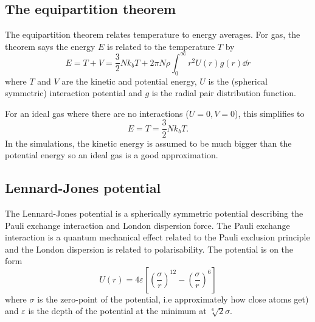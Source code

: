 \documentclass[fleqn]{scrartcl}
\renewcommand{\epsilon}{\varepsilon}
\begin{document}
	
	\subsection{The equipartition theorem}
	The equipartition theorem relates temperature to energy averages. For gas, the theorem says the energy $E$ is related to the temperature $T$ by
	\begin{equation}
		E = T + V = \frac32 Nk_bT+2\pi N\rho\int_0^\infty r^2U(r)g(r)\dd{r}
	\end{equation}
	where $T$ and $V$ are the kinetic and potential energy, $U$ is the (spherical symmetric) interaction potential and $g$ is the radial pair distribution function. 
	
	For an ideal gas where there are no interactions ($U=0,V=0$), this simplifies to	
	\begin{equation}
		E = T = \frac32Nk_b T.
	\end{equation}
	In the simulations, the kinetic energy is assumed to be much bigger than the potential energy so an ideal gas is a good approximation.
	
	
	\subsection{Lennard-Jones potential}
	The Lennard-Jones potential is a spherically symmetric potential describing the Pauli exchange interaction and London dispersion force. The Pauli exchange interaction is a quantum mechanical effect related to the Pauli exclusion principle and the London dispersion is related to polarisability. The potential is on the form
	\begin{equation}
		U(r) = 4\epsilon\left[\left(\frac{\sigma}{r}\right)^{12}-\left(\frac{\sigma}{r}\right)^6\right]
	\end{equation}
	where $\sigma$ is the zero-point of the potential, i.e approximately how close atoms get) and $\epsilon$ is the depth of the potential at the minimum at $\sqrt[6]{2}\sigma$.
\end{document}
